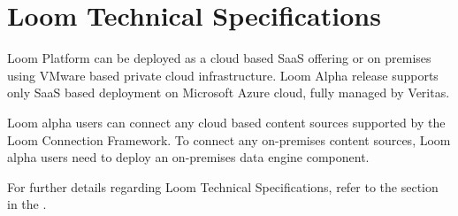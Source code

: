 \documentclass[letterpaper,10pt,english]{sphinxhowto}
\begin{document}
\section{Loom Technical Specifications}
\label{\detokenize{col/ds/mcdmp_ds_alpha1:loom-technical-specifications}}
Loom Platform can be deployed as a cloud based SaaS offering or on premises using VMware based private cloud infrastructure.  Loom Alpha release supports only SaaS based deployment on Microsoft Azure cloud, fully managed by Veritas.


Loom alpha users can connect any cloud based content sources supported by the Loom Connection Framework. To connect any on-premises content sources, Loom alpha users need to deploy an on-premises data engine component.

For further details regarding Loom Technical Specifications, refer to the  section in the .




\renewcommand{\indexname}{Index}
\printindex
\end{document}
